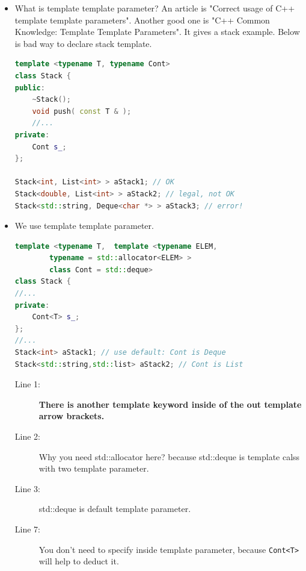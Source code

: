 \documentclass[a4paper,11pt,twoside]{book}
\begin{document}
\begin{itemize}
\item What is template template parameter? An article is "Correct usage of C++ template template parameters". Another good one is "C++ Common Knowledge: Template Template Parameters". It gives a stack example. Below is bad way to declare stack template.
\begin{lstlisting}[frame=single, language=c++]
template <typename T, typename Cont>
class Stack {
public:
	~Stack();
	void push( const T & );
	//...
private:
	Cont s_;
};

Stack<int, List<int> > aStack1; // OK
Stack<double, List<int> > aStack2; // legal, not OK           
Stack<std::string, Deque<char *> > aStack3; // error!   
\end{lstlisting}
\item We use template template parameter. 

\begin{lstlisting}[frame=single, language=c++]
template <typename T,  template <typename ELEM, 
		typename = std::allocator<ELEM> > 
		class Cont = std::deque>
class Stack {
//...
private:
	Cont<T> s_;
};
//...
Stack<int> aStack1; // use default: Cont is Deque
Stack<std::string,std::list> aStack2; // Cont is List
\end{lstlisting}
\begin{description}
	\item[Line 1:] \textbf{There is another template keyword inside of the out template arrow brackets.} 
	
	\item[Line 2:] Why you need std::allocator here? because std::deque is template calss with two template parameter.
	
	\item[Line 3:] std::deque is default template parameter.
	
	\item[Line 7:] You don't need to specify inside template parameter, because \texttt{Cont<T>} will help to deduct it.
	
	
	
\end{description}

\end{itemize}
\end{document}
